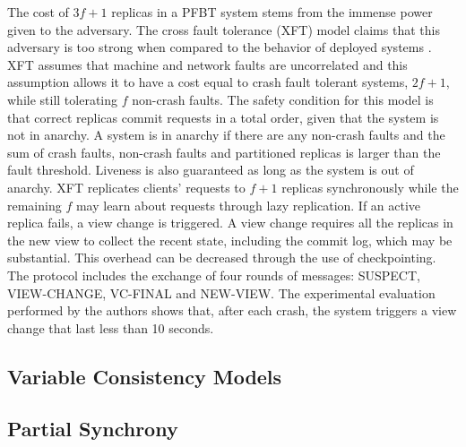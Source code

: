 \documentclass[runningheads,a4paper]{llncs}
\begin{document}
The cost of $3f+1$ replicas in a PFBT system stems from the immense power given to the adversary. The cross fault tolerance (XFT) model claims that this adversary is too strong when compared to the behavior of deployed systems \cite{Liu2015}. XFT assumes that machine and network faults are uncorrelated and this assumption allows it to have a cost equal to crash fault tolerant systems, $2f+1$, while still tolerating $f$ non-crash faults. The safety condition for this model is that correct replicas commit requests in a total order, given that the system is not in anarchy. A system is in anarchy if there are any non-crash faults and the sum of crash faults, non-crash faults and partitioned replicas is larger than the fault threshold. 
Liveness is also guaranteed as long as the system is out of anarchy. XFT replicates clients' requests to $f+1$ replicas synchronously while the remaining $f$ may learn about requests through lazy replication. If an active replica fails, a view change is triggered. A view change requires all the replicas in the new view to collect the recent state, including the commit log, which may be substantial. This overhead can be decreased through the use of checkpointing. The protocol includes the exchange of four rounds of messages: SUSPECT, VIEW-CHANGE, VC-FINAL and NEW-VIEW. The experimental evaluation performed by the authors shows that, after each crash, the system triggers a view change that last less than 10 seconds. 
\subsection{Variable Consistency Models}

\subsection{Partial Synchrony}



\end{document}
